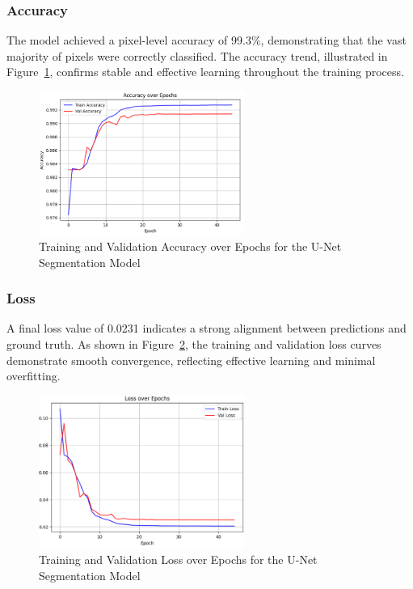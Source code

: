 \subsubsection{Accuracy}
The model achieved a pixel-level accuracy of 99.3\%, demonstrating that the vast majority of pixels were correctly classified. The accuracy trend, illustrated in Figure~\ref{fig:unet-acc}, confirms stable and effective learning throughout the training process.
\begin{figure}[ht]
  \centering
  \includegraphics[width=0.6\textwidth]{Images/Chapter3/unet_acc.png}
  \caption{Training and Validation Accuracy over Epochs for the U-Net Segmentation Model}
  \label{fig:unet-acc}
\end{figure}

\subsubsection{Loss}
A final loss value of 0.0231 indicates a strong alignment between predictions and ground truth. As shown in Figure~\ref{fig:unet-loss}, the training and validation loss curves demonstrate smooth convergence, reflecting effective learning and minimal overfitting.

\begin{figure}[h]
  \centering
  \includegraphics[width=0.6\textwidth]{Images/Chapter3/unet_loss.png}
  \caption{Training and Validation Loss over Epochs for the U-Net Segmentation Model}
  \label{fig:unet-loss}
\end{figure}


